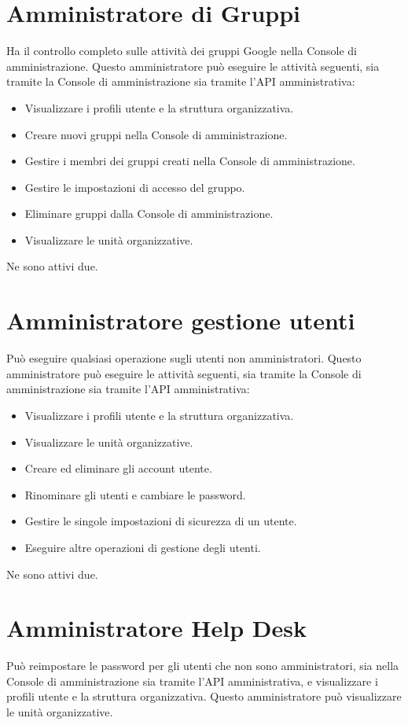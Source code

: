 \section{Amministratore di Gruppi}
Ha il controllo completo sulle attività dei gruppi Google nella Console di amministrazione. Questo amministratore può eseguire le attività seguenti, sia tramite la Console di amministrazione sia tramite l'API amministrativa:
\begin{itemize}
\item Visualizzare i profili utente e la struttura organizzativa.
\item Creare nuovi gruppi nella Console di amministrazione.
\item Gestire i membri dei gruppi creati nella Console di amministrazione.
\item Gestire le impostazioni di accesso del gruppo.
\item Eliminare gruppi dalla Console di amministrazione.
\item Visualizzare le unità organizzative.
\end{itemize}
Ne sono attivi due.
\section{Amministratore gestione utenti}
Può eseguire qualsiasi operazione sugli utenti non amministratori. Questo amministratore può eseguire le attività seguenti, sia tramite la Console di amministrazione sia tramite l'API amministrativa:
\begin{itemize}
\item Visualizzare i profili utente e la struttura organizzativa.
	\item Visualizzare le unità organizzative.
	\item Creare ed eliminare gli account utente. 
	\item Rinominare gli utenti e cambiare le password. 
	\item Gestire le singole impostazioni di sicurezza di un utente. 
	\item Eseguire altre operazioni di gestione degli utenti.
\end{itemize}
Ne sono attivi due.
\section{Amministratore Help Desk}
Può reimpostare le password per gli utenti che non sono amministratori, sia nella Console di amministrazione sia tramite l'API amministrativa, e visualizzare i profili utente e la struttura organizzativa. Questo amministratore può visualizzare le unità organizzative.

